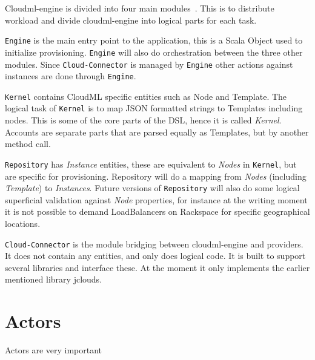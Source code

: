 Cloudml-engine is divided into four main modules~.
This is to distribute workload and divide cloudml-engine into logical parts for each task.

\texttt{Engine} is the main entry point to the application, this is a Scala Object used to initialize
provisioning.
\texttt{Engine} will also do orchestration between the three other modules.
Since \texttt{Cloud-Connector} is managed by \texttt{Engine} other actions against 
instances are done through \texttt{Engine}.

\texttt{Kernel} contains CloudML specific entities such as Node and Template.
The logical task of \texttt{Kernel} is to map JSON formatted strings to Templates including nodes.
This is some of the core parts of the DSL, hence it is called \emph{Kernel}.
Accounts are separate parts that are parsed equally as Templates, but by another method call.

\texttt{Repository} has \emph{Instance} entities, these are equivalent to \emph{Nodes} in \texttt{Kernel},
but are specific for provisioning. Repository will do a mapping from \emph{Nodes} (including \emph{Template})
to \emph{Instances}. Future versions of \texttt{Repository} will also do some logical superficial validation
against \emph{Node} properties, for instance at the writing moment it is not possible to 
demand LoadBalancers on Rackspace for specific geographical locations.

\texttt{Cloud-Connector} is the module bridging between cloudml-engine and providers.
It does not contain any entities, and only does logical code. 
It is built to support several libraries and interface these. At the moment it only implements the earlier
mentioned library jclouds.

\section{Actors}

Actors are very important

